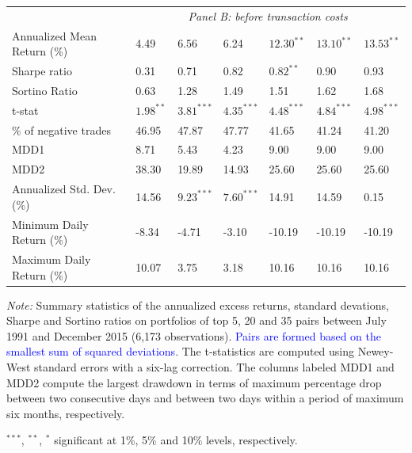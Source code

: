 \begin{threeparttable}[H]
\begin{tabularx}{\textwidth}{@{\extracolsep{\fill}}lllllll@{}}
		\midrule
& \multicolumn{6}{c}{\textit {Panel B: before transaction costs}} \\ 
		Annualized Mean Return (\%) & 4.49  & 6.56  & 6.24  & $12.30^{**}$ & $13.10^{**}$ & $13.53^{**}$ \\
		Sharpe ratio & 0.31  & 0.71  & 0.82  & $0.82^{**}$  & 0.90  & 0.93 \\
		Sortino Ratio & 0.63  & 1.28  & 1.49  & 1.51  & 1.62  & 1.68 \\
		t-stat & $1.98^{**}$  & $3.81^{***}$  & $4.35^{***}$  & $4.48^{***}$  & $4.84^{***}$  & $4.98^{***}$ \\
		\% of negative trades & 46.95 & 47.87 & 47.77 & 41.65 & 41.24 & 41.20 \\
		MDD1  & 8.71  & 5.43  & 4.23  & 9.00  & 9.00  & 9.00 \\
		MDD2  & 38.30 & 19.89 & 14.93 & 25.60 & 25.60 & 25.60 \\
		Annualized Std. Dev. (\%) & 14.56 & $9.23^{***}$  & $7.60^{***}$  & 14.91 & 14.59 & 0.15 \\
		Minimum Daily Return (\%) & -8.34 & -4.71 & -3.10 & -10.19 & -10.19 & -10.19 \\
		Maximum Daily Return (\%) & 10.07 & 3.75  & 3.18  & 10.16 & 10.16 & 10.16 \\
		\bottomrule
\end{tabularx}
\begin{tablenotes}
\item \textit{Note:} \scriptsize Summary statistics of the annualized excess returns, standard devations, Sharpe and Sortino ratios on portfolios of top 5, 20 and 35 pairs between July 1991 and December 2015 (6,173 observations). \textcolor{blue} {Pairs are formed based on the smallest sum of squared deviations}. The t-statistics are computed using Newey-West standard errors with a six-lag correction. The columns labeled MDD1 and MDD2 compute the largest drawdown in terms of maximum percentage drop between two consecutive days and between two days within a period of maximum six months, respectively.
\item \footnotesize $^{\ast\ast\ast}$, $^{\ast\ast}$, $^{\ast}$  significant at 1\%, 5\% and 10\% levels, respectively.
\end{tablenotes}
\label{tab:table101}
\end{threeparttable}


